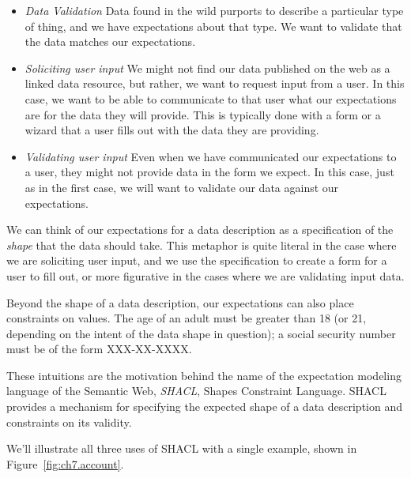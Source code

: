 \begin{itemize}
    \item \emph{Data Validation} \label{datav} Data found in the wild purports to describe a particular type of thing, and we have
    expectations about that type.  We want to validate that the data matches our expectations.

  \item \emph{Soliciting user input} \label{form}
      We might not find our data published on the web as a linked data resource, but
      rather, we want to request input from a user.  In this case, we want to be able to communicate to that user what
      our expectations are for the data they will provide.  This is typically done with a form or a wizard that a user
      fills out with the data they are providing.

    \item \emph{Validating user input} \label{userv} Even when we have communicated our expectations to a user,
      they might not provide 
      data in the form we expect.  In this case, just as in the first case, we will want to validate our data against our
      expectations.
\end{itemize}

We can think of our expectations for a data description as a specification of the \emph{shape} that the data should take.  
This metaphor is quite literal in the case where we are soliciting user input, and we use the specification to create a 
form for a user to fill out, or more figurative in the cases where we are validating input data. 

Beyond the shape of a data description, our expectations can also place constraints on values.  
The age of an adult must be greater than 18 (or 21, depending on the intent of the data shape in question);  
a social security number must be of the form XXX-XX-XXXX.

These intuitions are the motivation behind the name of the expectation modeling language of the Semantic Web, \emph{SHACL}, 
Shapes Constraint Language.  SHACL provides a mechanism for specifying the expected shape of a data description and 
constraints on its validity.

We'll illustrate all three uses of SHACL with a single example, shown in Figure~\ref{fig:ch7.account}.

